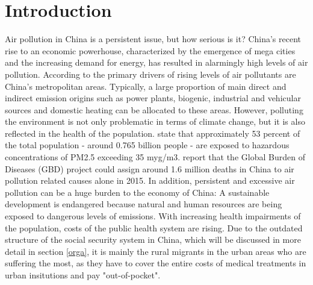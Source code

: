 \documentclass[
]{article}
\begin{document}
	\hypertarget{introduction}{%
		\section{Introduction}\label{introduction}}
	Air pollution in China is a persistent issue, but how serious is it? China's recent rise to an economic powerhouse, characterized by the emergence of mega cities and the increasing demand for energy, has resulted in alarmingly high levels of air pollution. According to  \cite{chan2008air} the primary drivers of rising levels of air pollutants are China's metropolitan areas. Typically, a large proportion of main direct and indirect emission origins such as power plants, biogenic, industrial and vehicular sources and domestic heating can be allocated to these areas.
	However, polluting the environment is not only problematic in terms of climate change, but it is also reflected in the health of the population. \cite{maruyama2022air} state that approximately 53 percent of the total population - around 0.765 billion people - are exposed to hazardous concentrations of PM2.5 exceeding 35 myg/m3. %
	\cite{song_air_2017} report that the Global Burden of Diseases (GBD) project could assign around 1.6 million deaths in China to air pollution related causes alone in 2015. In addition, persistent and excessive air pollution can be a huge burden to the economy of China: A sustainable development is endangered because natural and human resources are being exposed to dangerous levels of  emissions. With increasing health impairments of the population, costs of the public health system are rising. 
	Due to the outdated structure of the social security system in China, which will be discussed in more detail in section \ref{orga}, it is mainly the rural migrants in the urban areas who are suffering the most, as they have to cover the entire costs of medical treatments in urban insitutions and pay "out-of-pocket". 
\end{document}
